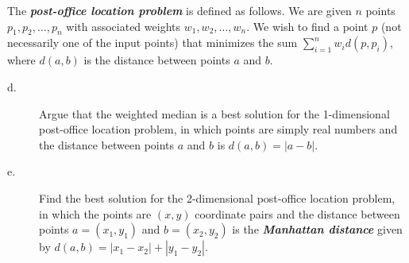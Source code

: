 The \textsl{\textbf{post-office location problem}} is defined as follows. We are given $n$ points $p_1, p_2, \ldots, p_n$ with associated weights $w_1, w_2, \ldots, w_n$. We wish to find
a point $p$ (not necessarily one of the input points) that minimizes the sum $\sum_{i = 1}^n w_i d(p, p_i)$, where $d(a, b)$ is the distance between points $a$ and $b$.

\begin{description}
\item[d. \hspace{9pt}] Argue that the weighted median is a best solution for the 1-dimensional post-office location problem, in which points are simply real numbers and the distance between
points $a$ and $b$ is $d(a, b) = |a-b|$.

\item[e. \hspace{9pt}] Find the best solution for the 2-dimensional post-office location problem, in which the points are $(x, y)$ coordinate pairs and the distance between points 
$a = (x_1, y_1)$ and $b = (x_2, y_2)$ is the \textsl{\textbf{Manhattan distance}} given by $d(a, b) = |x_1 - x_2| + |y_1 - y_2|$.
\end{description}

